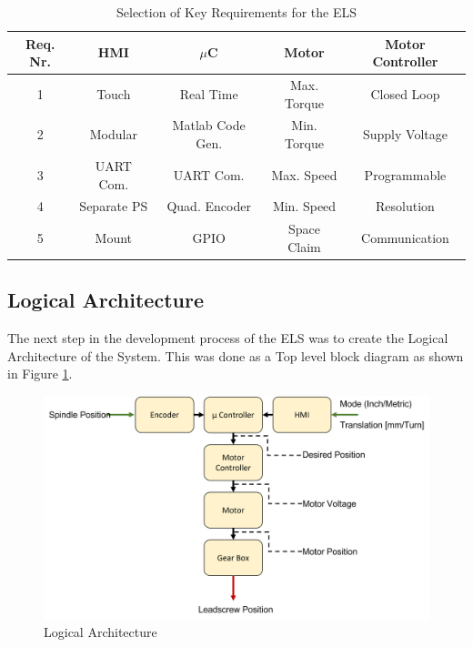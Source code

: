 \begin{table}
    \centering
     \begin{tabular}{||c|c|c|c|c||}
        \hline
        Req. Nr. & HMI & $\mu$C & Motor & Motor Controller \\ [0.5ex]
        \hline\hline
        1 & Touch       & Real Time         &  Max. Torque   & Closed Loop   \\
        2 & Modular     & Matlab Code Gen.  &  Min. Torque   & Supply Voltage\\
        3 & UART Com.   & UART Com.         &  Max. Speed   & Programmable  \\
        4 & Separate PS  & Quad. Encoder     &  Min. Speed   & Resolution    \\
        5 & Mount       & GPIO              &  Space Claim  & Communication \\ [1ex]
        \hline
     \end{tabular}
     \caption{Selection of Key Requirements for the ELS}
     \label{Tab Key Requirements}
\end{table}
 
 
 
 
\subsection{Logical Architecture}
 
The next step in the development process of the ELS was to create the Logical Architecture of the System. This was done as a Top level block diagram as shown in Figure \ref{Logical Architecture}.
 
\begin{figure}
    \begin{center}
    \includegraphics[width=12cm]{Pictures/Logical Architecture.png}
    \caption[Logical Architecture]{Logical Architecture}
    \label{Logical Architecture}
    \end{center}
\end{figure}
 
